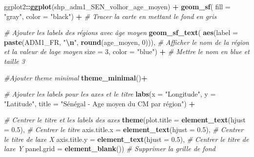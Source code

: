 \documentclass[
]{article}
\newenvironment{Shaded}{\begin{snugshade}}{\end{snugshade}}
\newcommand{\AttributeTok}[1]{\textcolor[rgb]{0.13,0.29,0.53}{#1}}
\newcommand{\CommentTok}[1]{\textcolor[rgb]{0.56,0.35,0.01}{\textit{#1}}}
\newcommand{\DecValTok}[1]{\textcolor[rgb]{0.00,0.00,0.81}{#1}}
\newcommand{\FloatTok}[1]{\textcolor[rgb]{0.00,0.00,0.81}{#1}}
\newcommand{\FunctionTok}[1]{\textcolor[rgb]{0.13,0.29,0.53}{\textbf{#1}}}
\newcommand{\NormalTok}[1]{#1}
\newcommand{\SpecialCharTok}[1]{\textcolor[rgb]{0.81,0.36,0.00}{\textbf{#1}}}
\newcommand{\StringTok}[1]{\textcolor[rgb]{0.31,0.60,0.02}{#1}}
\begin{document}
\begin{Shaded}
\begin{Highlighting}[]
\NormalTok{ggplot2}\SpecialCharTok{::}\FunctionTok{ggplot}\NormalTok{(shp\_adm1\_SEN\_volhor\_age\_moyen) }\SpecialCharTok{+}
  \FunctionTok{geom\_sf}\NormalTok{( }\AttributeTok{fill =} \StringTok{"gray"}\NormalTok{, }\AttributeTok{color =} \StringTok{"black"}\NormalTok{) }\SpecialCharTok{+} \CommentTok{\# Tracer la carte en mettant le fond en gris}
  
  \CommentTok{\# Ajouter les labels des régions avec âge moyen}
  \FunctionTok{geom\_sf\_text}\NormalTok{( }
               \FunctionTok{aes}\NormalTok{(}\AttributeTok{label =} \FunctionTok{paste}\NormalTok{(ADM1\_FR, }\StringTok{"}\SpecialCharTok{\textbackslash{}n}\StringTok{"}\NormalTok{, }\FunctionTok{round}\NormalTok{(age\_moyen, }\DecValTok{0}\NormalTok{))), }\CommentTok{\# Afficher le nom de la région et la valeur de l\textquotesingle{}age moyen}
               \AttributeTok{size =} \DecValTok{3}\NormalTok{, }\AttributeTok{color =} \StringTok{"blue"}\NormalTok{) }\SpecialCharTok{+}  \CommentTok{\# Mettre le nom en blue et taille 3}
  
  \CommentTok{\#Ajouter theme minimal}
  \FunctionTok{theme\_minimal}\NormalTok{()}\SpecialCharTok{+}
  
  \CommentTok{\# Ajouter les labels pour les axes et le titre}
  \FunctionTok{labs}\NormalTok{(}\AttributeTok{x =} \StringTok{"Longitude"}\NormalTok{, }\AttributeTok{y =} \StringTok{"Latitude"}\NormalTok{, }\AttributeTok{title =} \StringTok{"Sénégal {-} Age moyen du CM par région"}\NormalTok{) }\SpecialCharTok{+}  
  
  \CommentTok{\# Centrer le titre et les labels des axes}
  \FunctionTok{theme}\NormalTok{(}\AttributeTok{plot.title =} \FunctionTok{element\_text}\NormalTok{(}\AttributeTok{hjust =} \FloatTok{0.5}\NormalTok{),  }\CommentTok{\# Centrer le titre}
        \AttributeTok{axis.title.x =} \FunctionTok{element\_text}\NormalTok{(}\AttributeTok{hjust =} \FloatTok{0.5}\NormalTok{),  }\CommentTok{\# Centrer le titre de l\textquotesingle{}axe X}
        \AttributeTok{axis.title.y =} \FunctionTok{element\_text}\NormalTok{(}\AttributeTok{hjust =} \FloatTok{0.5}\NormalTok{),  }\CommentTok{\# Centrer le titre de l\textquotesingle{}axe Y}
        \AttributeTok{panel.grid =} \FunctionTok{element\_blank}\NormalTok{())  }\CommentTok{\# Supprimer la grille de fond}
\end{Highlighting}
\end{Shaded}
\end{document}
